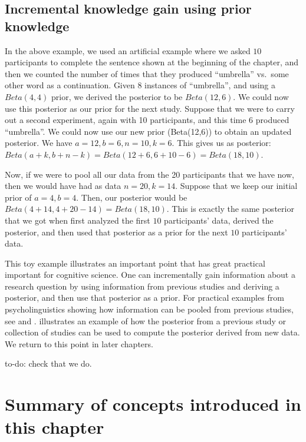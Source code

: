 \documentclass[12pt,]{krantz}
\theoremstyle{definition}
\theoremstyle{definition}
\theoremstyle{definition}
\theoremstyle{remark}
\let\BeginKnitrBlock\begin \let\EndKnitrBlock\end
\begin{document}
\hypertarget{incremental-knowledge-gain-using-prior-knowledge}{%
\subsection{Incremental knowledge gain using prior knowledge}\label{incremental-knowledge-gain-using-prior-knowledge}}

In the above example, we used an artificial example where we asked \(10\) participants to complete the sentence shown at the beginning of the chapter, and then we counted the number of times that they produced ``umbrella'' vs.~some other word as a continuation. Given 8 instances of ``umbrella'', and using a \(Beta(4,4)\) prior, we derived the posterior to be \(Beta(12,6)\). We could now use this posterior as our prior for the next study. Suppose that we were to carry out a second experiment, again with 10 participants, and this time \(6\) produced ``umbrella''. We could now use our new prior (Beta(12,6)) to obtain an updated posterior. We have \(a=12, b=6, n=10, k=6\). This gives us as posterior:
\(Beta(a+k,b+n-k) = Beta(12+6,6+10-6)=Beta(18,10)\).

Now, if we were to pool all our data from the 20 participants that we have now, then we would have had as data \(n=20, k=14\). Suppose that we keep our initial prior of \(a=4,b=4\). Then, our posterior would be \(Beta(4+14,4+20-14)=Beta(18,10)\). This is exactly the same posterior that we got when first analyzed the first \(10\) participants' data, derived the posterior, and then used that posterior as a prior for the next \(10\) participants' data.

This toy example illustrates an important point that has great practical important for cognitive science. One can incrementally gain information about a research question by using information from previous studies and deriving a posterior, and then use that posterior as a prior. For practical examples from psycholinguistics showing how information can be pooled from previous studies, see \citet{JaegerEngelmannVasishth2017} and \citet{NicenboimRoettgeretal}. \citet{VasishthEngelmann2020} illustrates an example of how the posterior from a previous study or collection of studies can be used to compute the posterior derived from new data. We return to this point in later chapters.

\BeginKnitrBlock{rmdnote}
to-do: check that we do.
\EndKnitrBlock{rmdnote}

\hypertarget{summary-of-concepts-introduced-in-this-chapter-1}{%
\section{Summary of concepts introduced in this chapter}\label{summary-of-concepts-introduced-in-this-chapter-1}}
\end{document}
